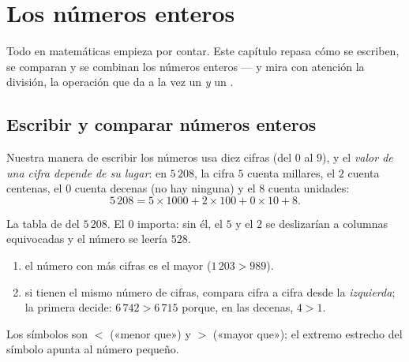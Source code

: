 \chapter{Los números enteros}\label{ch:g6:wholes}

Todo en matemáticas empieza por contar. Este capítulo repasa cómo
se escriben, se comparan y se combinan los números enteros --- y mira con
atención la división, la operación que da a la vez un  \emph{y} un
.

\section{Escribir y comparar números enteros}

\begin{definition}\label{def:g6:wholes:place}
Nuestra manera de escribir los números usa diez cifras (del $0$ al $9$), y el
\emph{valor de una cifra depende de su lugar}: en
$5\,208$, la cifra $5$ cuenta millares, el $2$ cuenta centenas, el
$0$ cuenta decenas (no hay ninguna) y el $8$ cuenta unidades:
\[
5\,208 = 5 \times 1000 + 2 \times 100 + 0 \times 10 + 8 .
\]
\end{definition}

\begin{omfigure}

{\small La tabla de  del $5\,208$. El $0$ importa: sin él,
el $5$ y el $2$ se deslizarían a columnas equivocadas y el número
se leería $528$.}
\end{omfigure}

\begin{method}\label{met:g6:wholes:compare}
\begin{enumerate}
  \item el número con más cifras es el mayor
        ($1\,203 > 989$).
  \item si tienen el mismo número de cifras, compara cifra a cifra
        desde la \emph{izquierda}; la primera  decide:
        $6\,742 > 6\,715$ porque, en las decenas, $4 > 1$.
\end{enumerate}
Los símbolos son $<$ («menor que») y $>$ («mayor que»); el
extremo estrecho del símbolo apunta al número pequeño.
\end{method}

